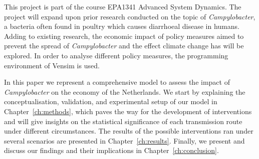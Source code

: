 This project is part of the course EPA1341 Advanced System Dynamics. The project will expand upon prior research conducted on the topic of \textit{Campylobacter}, a bacteria often found in poultry which causes diarrhoeal disease in humans. Adding to existing research, the economic impact of policy measures aimed to prevent the spread of  \textit{Campylobacter} and the effect climate change has will be explored. In order to analyse different policy measures, the programming environment of Vensim is used. 

In this paper we represent a comprehensive model to assess the impact of \textit{Campylobacter} on the economy of the Netherlands. We start by explaining the conceptualisation, validation, and experimental setup of our model in Chapter~\ref{ch:methods}, which paves the way for the development of interventions and will give insights on the statistical significance of each transmission route under different circumstances. The results of the possible interventions ran under several scenarios are presented in Chapter~\ref{ch:results}. Finally, we present and discuss our findings and their implications in Chapter~\ref{ch:conclusion}.